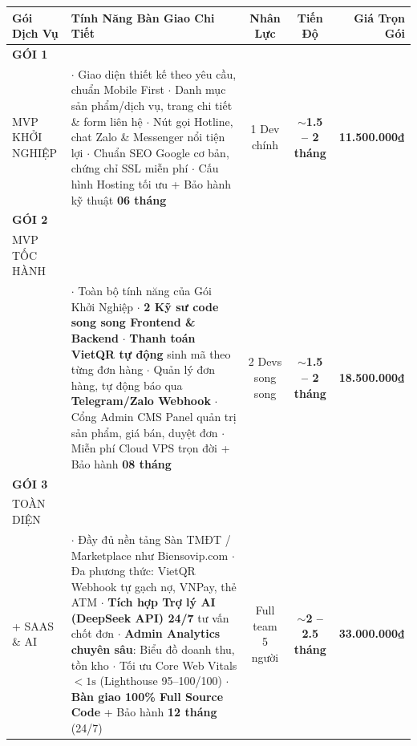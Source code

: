 \documentclass[11pt,a4paper]{article}
\begin{document}
\noindent
\begingroup
\small
\renewcommand{\arraystretch}{1.1}
\begin{tabularx}{\textwidth}{>{\raggedright\arraybackslash}p{2.6cm}Xccr}
\toprule
\textbf{Gói Dịch Vụ} & \textbf{Tính Năng Bàn Giao Chi Tiết} & \textbf{Nhân Lực} & \textbf{Tiến Độ} & \textbf{Giá Trọn Gói} \\
\midrule
\textbf{GÓI 1}\\MVP KHỞI NGHIỆP
& $\cdot$ Giao diện thiết kế theo yêu cầu, chuẩn Mobile First\newline
  $\cdot$ Danh mục sản phẩm/dịch vụ, trang chi tiết \& form liên hệ\newline
  $\cdot$ Nút gọi Hotline, chat Zalo \& Messenger nổi tiện lợi\newline
  $\cdot$ Chuẩn SEO Google cơ bản, chứng chỉ SSL miễn phí\newline
  $\cdot$ Cấu hình Hosting tối ưu + Bảo hành kỹ thuật \textbf{06 tháng}
& 1 Dev chính
& $\sim$\textbf{1.5 -- 2 tháng}
& \textbf{11.500.000₫} \\
\midrule
\rowcolor{accentlight}
\textbf{GÓI 2}\\MVP TỐC HÀNH\\{\color{primary}\textbf{\textit{Đề xuất $\cdot$ 2 Devs}}}
& $\cdot$ Toàn bộ tính năng của Gói Khởi Nghiệp\newline
  $\cdot$ \textbf{2 Kỹ sư code song song Frontend \& Backend}\newline
  $\cdot$ \textbf{Thanh toán VietQR tự động} sinh mã theo từng đơn hàng\newline
  $\cdot$ Quản lý đơn hàng, tự động báo qua \textbf{Telegram/Zalo Webhook}\newline
  $\cdot$ Cổng Admin CMS Panel quản trị sản phẩm, giá bán, duyệt đơn\newline
  $\cdot$ Miễn phí Cloud VPS trọn đời + Bảo hành \textbf{08 tháng}
& 2 Devs song song
& $\sim$\textbf{1.5 -- 2 tháng}
& \textbf{18.500.000₫} \\
\midrule
\textbf{GÓI 3}\\TOÀN DIỆN\\+ SAAS \& AI
& $\cdot$ Đầy đủ nền tảng Sàn TMĐT / Marketplace như Biensovip.com\newline
  $\cdot$ Đa phương thức: VietQR Webhook tự gạch nợ, VNPay, thẻ ATM\newline
  $\cdot$ \textbf{Tích hợp Trợ lý AI (DeepSeek API) 24/7} tư vấn chốt đơn\newline
  $\cdot$ \textbf{Admin Analytics chuyên sâu}: Biểu đồ doanh thu, tồn kho\newline
  $\cdot$ Tối ưu Core Web Vitals $<1\text{s}$ (Lighthouse 95--100/100)\newline
  $\cdot$ \textbf{Bàn giao 100\% Full Source Code} + Bảo hành \textbf{12 tháng} (24/7)
& Full team 5 người
& $\sim$\textbf{2 -- 2.5 tháng}
& \textbf{33.000.000₫} \\
\bottomrule
\end{tabularx}
\endgroup
\end{document}
